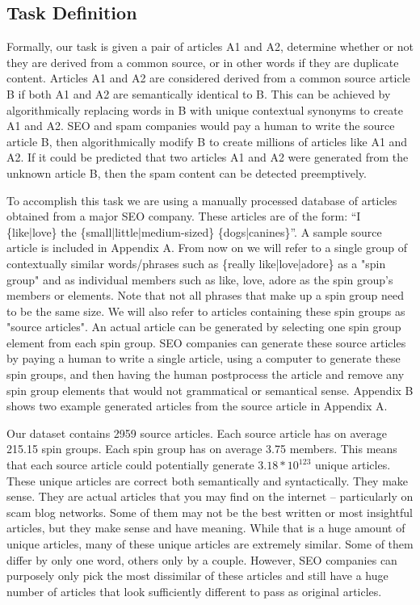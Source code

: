 \documentclass[11pt,letterpaper,oneside, titlepage]{scrartcl}
\begin{document}
\subsection{Task Definition}

Formally, our task is given a pair of articles A1 and A2, determine whether or not they are derived from a common source, or in other words if they are duplicate content. Articles A1 and A2 are considered derived from a common source article B if both A1 and A2 are semantically identical to B. This can be achieved by algorithmically replacing words in B with unique contextual synonyms to create A1 and A2. SEO and spam companies would pay a human to write the source article B, then algorithmically modify B to create millions of articles like A1 and A2. If it could be predicted that two articles A1 and A2 were generated from the unknown article B, then the spam content can be detected preemptively.

To accomplish this task we are using a manually processed database of articles obtained from a major SEO company. These articles are of the form: ``I \{like|love\} the \{small|little|medium-sized\} \{dogs|canines\}''. A sample source article is included in Appendix A. From now on we will refer to a single group of contextually similar words/phrases such as \{really like|love|adore\} as a "spin group" and as individual members such as like, love, adore as the spin group's members or elements. Note that not all phrases that make up a spin group need to be the same size. We will also refer to articles containing these spin groups as "source articles". An actual article can be generated by selecting one spin group element from each spin group. SEO companies can generate these source articles by paying a human to write a single article, using a computer to generate these spin groups, and then having the human postprocess the article and remove any spin group elements that would not grammatical or semantical sense. Appendix B shows two example generated articles from the source article in Appendix A.

Our dataset contains 2959 source articles. Each source article has on average 215.15 spin groups. Each spin group has on average 3.75 members. This means that each source article could potentially generate $3.18*10^{123}$ unique articles. These unique articles are correct both semantically and syntactically. They make sense. They are actual articles that you may find on the internet – particularly on scam blog networks. Some of them may not be the best written or most insightful articles, but they make sense and have meaning.  While that is a huge amount of unique articles, many of these unique articles are extremely similar. Some of them differ by only one word, others only by a couple. However, SEO companies can purposely only pick the most dissimilar of these articles and still have a huge number of articles that look sufficiently different to pass as original articles.
\end{document}
